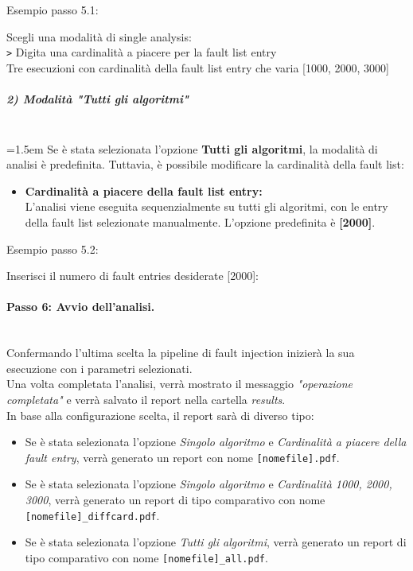 \documentclass{article}
\begin{document}
Esempio passo 5.1: 
\begin{tcolorbox}[colback=black, coltext=white, sharp corners, boxrule=0.5mm, width=\textwidth]
Scegli una modalità di single analysis: \\
\texttt{>} Digita una cardinalità a piacere per la fault list entry \\
\hspace{2.5em}Tre esecuzioni con cardinalità della fault list entry che varia [1000, 2000, 3000]
\end{tcolorbox}

\subparagraph{2) Modalità "Tutti gli algoritmi"}\leavevmode\\
\hangindent=1.5em   
Se è stata selezionata l'opzione \textbf{Tutti gli algoritmi}, la modalità di analisi è predefinita. Tuttavia, è possibile modificare la cardinalità della fault list:
\begin{itemize}
    \item \textbf{Cardinalità a piacere della fault list entry:}\\
    L'analisi viene eseguita sequenzialmente su tutti gli algoritmi, con le entry della fault list selezionate manualmente. L'opzione predefinita è \textbf{[2000]}.
\end{itemize}

Esempio passo 5.2:
\begin{tcolorbox}[colback=black, coltext=white, sharp corners, boxrule=0.5mm, width=\textwidth]
Inserisci il numero di fault entries desiderate [2000]:
\end{tcolorbox}



\paragraph{Passo 6: Avvio dell'analisi.}\leavevmode\\
Confermando l'ultima scelta la pipeline di fault injection inizierà la sua esecuzione con i parametri selezionati.\\
Una volta completata l'analisi, verrà mostrato il messaggio \textit{"operazione completata"} e verrà salvato il report nella cartella \textit{results}. \\
In base alla configurazione scelta, il report sarà di diverso tipo:
\begin{itemize}
    \item Se è stata selezionata l'opzione \textit{Singolo algoritmo} e \textit{Cardinalità a piacere della fault entry}, verrà generato un report con nome \texttt{[nomefile].pdf}.
    \item Se è stata selezionata l'opzione \textit{Singolo algoritmo} e \textit{Cardinalità 1000, 2000, 3000}, verrà generato un report di tipo comparativo con nome \texttt{[nomefile]\_diffcard.pdf}.
    \item Se è stata selezionata l'opzione \textit{Tutti gli algoritmi}, verrà generato un report di tipo comparativo con nome \texttt{[nomefile]\_all.pdf}.
\end{itemize}
\end{document}
